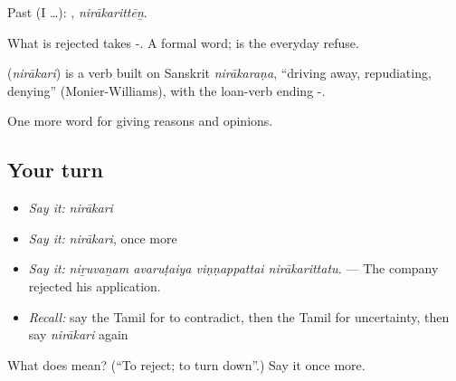 Past (I …): , \emph{nirākarittēṉ}.

What is rejected takes -. A formal word;  is the everyday refuse.

\begin{cousinweb}
\textbf{} (\emph{nirākari}) is a verb built on Sanskrit \emph{nirākaraṇa}, \textquotedblleft{}driving away, repudiating, denying\textquotedblright{} (Monier-Williams), with the loan-verb ending -.
\end{cousinweb}

\begin{grammarlens}[title={What you've built}]
One more word for giving reasons and opinions.
\end{grammarlens}

\subsection*{Your turn}
\begin{itemize}
\raggedright
  \item \emph{Say it:} \emph{nirākari}
  \item \emph{Say it:} \emph{nirākari}, once more
  \item \emph{Say it:} \emph{niṟuvaṉam avaruṭaiya viṇṇappattai nirākarittatu.} — The company rejected his application.
  \item \emph{Recall:} say the Tamil for to contradict, then the Tamil for uncertainty, then say \emph{nirākari} again
\end{itemize}

\begin{tcolorbox}[breakable,colback=teal!4,colframe=teal!35!black,title={Before you move on}]
What does  mean? (\textquotedblleft{}To reject; to turn down\textquotedblright{}.) Say it once more.
\end{tcolorbox}
